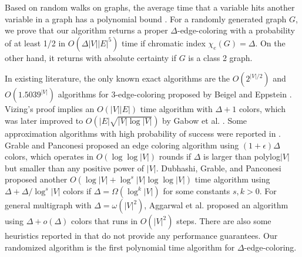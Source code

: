 \documentclass[11pt]{article}
\begin{document}
Based on random walks on graphs, the average time that a variable hits another variable in a graph has a polynomial bound \cite{aldous2002reversible} \cite{Aleliunas1979random} \cite{lovsz1993random} . For a randomly generated graph $G$, we prove that our algorithm returns a proper $\Delta$-edge-coloring with a probability of at least 1/2 in $O(\Delta|V||E|^5 )$ time if chromatic index $\chi_e(G)=\Delta$. On the other hand, it returns with absolute certainty if $G$ is a class 2 graph. 

In existing literature, the only known exact algorithms are the $O(2^{|V|/2})$ and $O({1.5039}^{|V|} )$ algorithms for 3-edge-coloring proposed by Beigel and Eppstein \cite{eppstein2001improved} \cite{beigel19953}. Vizing's proof implies an $O(|V||E|)$ time algorithm with $\Delta+1$ colors, which was later improved to $O(|E|\sqrt{|V|\log{|V|}})$ by Gabow et al. \cite{Gabowedgecoliring}. Some approximation algorithms with high probability of success were reported in \cite{grable1997nearly} \cite{dubhashi1998near} \cite{aggarwal2003switch}. Grable and Panconesi \cite{grable1997nearly} proposed an edge coloring algorithm using $(1+\epsilon)\Delta$ colors, which operates in $O(\log{}\log{|V|})$ rounds if $\Delta$ is larger than polylog$|V|$ but smaller than any positive power of $|V|$. Dubhashi, Grable, and Panconesi \cite{dubhashi1998near} proposed another $O(\log{|V|}+\log^s{|V|}\log{}\log{|V|})$ time algorithm using $\Delta+\Delta/\log^s{|V|}$ colors if $\Delta=\Omega(\log^k{|V|})$ for some constants $s,k>0$. For general multigraph with $\Delta=\omega(|V|^2)$, Aggarwal et al. \cite{aggarwal2003switch} proposed an algorithm using $\Delta+o(\Delta)$ colors that runs in $O(|V|^2)$ steps. There are also some heuristics reported in \cite{hilgemeier2003fast} that do not provide any performance guarantees. Our randomized algorithm is the first polynomial time algorithm for $\Delta$-edge-coloring.
\end{document}

